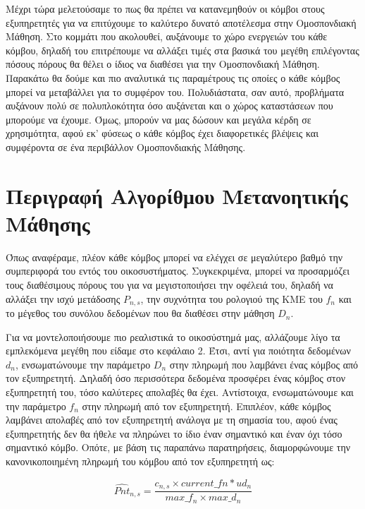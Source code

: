 Μέχρι τώρα μελετούσαμε το πως θα πρέπει να κατανεμηθούν οι κόμβοι στους εξυπηρετητές για να επιτύχουμε το καλύτερο δυνατό αποτέλεσμα στην Ομοσπονδιακή Μάθηση. Στο κομμάτι που ακολουθεί, αυξάνουμε το χώρο ενεργειών του κάθε κόμβου, δηλαδή του επιτρέπουμε να αλλάξει τιμές στα βασικά του μεγέθη επιλέγοντας πόσους πόρους θα θέλει ο ίδιος να διαθέσει για την Ομοσπονδιακή Μάθηση. Παρακάτω θα δούμε και πιο αναλυτικά τις παραμέτρους τις οποίες ο κάθε κόμβος μπορεί να μεταβάλλει για το συμφέρον του. Πολυδιάστατα, σαν αυτό, προβλήματα αυξάνουν πολύ σε πολυπλοκότητα όσο αυξάνεται και ο χώρος καταστάσεων που μπορούμε να έχουμε. Όμως, μπορούν να μας δώσουν και μεγάλα κέρδη σε χρησιμότητα, αφού εκ' φύσεως ο κάθε κόμβος έχει διαφορετικές βλέψεις και συμφέροντα σε ένα περιβάλλον Ομοσπονδιακής Μάθησης.

\section{Περιγραφή Αλγορίθμου Μετανοητικής Μάθησης}

Όπως αναφέραμε, πλέον κάθε κόμβος μπορεί να ελέγχει σε μεγαλύτερο βαθμό την συμπεριφορά του εντός του οικοσυστήματος. Συγκεκριμένα, μπορεί να προσαρμόζει τους διαθέσιμους πόρους του για να μεγιστοποιήσει την οφέλειά του, δηλαδή να αλλάξει την ισχύ μετάδοσης $P_{n,s}$, την συχνότητα του ρολογιού της ΚΜΕ του $f_n$ και το μέγεθος του συνόλου δεδομένων που θα διαθέσει στην μάθηση $D_n$.

Για να μοντελοποιήσουμε πιο ρεαλιστικά το οικοσύστημά μας, αλλάζουμε λίγο τα εμπλεκόμενα μεγέθη που είδαμε στο κεφάλαιο 2. Έτσι, αντί για ποιότητα δεδομένων $d_n$, ενσωματώνουμε την παράμετρο $D_n$ στην πληρωμή που λαμβάνει ένας κόμβος από τον εξυπηρετητή. Δηλαδή όσο περισσότερα δεδομένα προσφέρει ένας κόμβος στον εξυπηρετητή του, τόσο καλύτερες απολαβές θα έχει. Αντίστοιχα, ενσωματώνουμε και την παράμετρο $f_n$ στην πληρωμή από τον εξυπηρετητή. Επιπλέον, κάθε κόμβος λαμβάνει απολαβές από τον εξυπηρετητή ανάλογα με τη σημασία του, αφού ένας εξυπηρετητής δεν θα ήθελε να πληρώνει το ίδιο έναν σημαντικό και έναν όχι τόσο σημαντικό κόμβο. Οπότε, με βάση τις παραπάνω παρατηρήσεις, διαμορφώνουμε την κανονικοποιημένη πληρωμή του κόμβου από τον εξυπηρετητή ως:

\vspace{-5pt}

\begin{equation}
\hat{Pnt}_{n,s}=\frac{c_{n,s}\times current\_fn*ud_n}{max\_f_n\times max\_d_n}
\label{eq20}
\end{equation}


